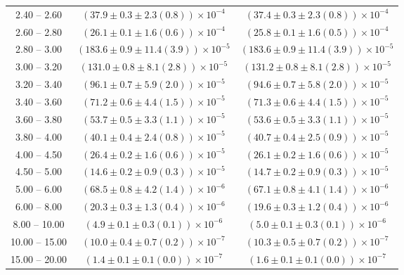 \begin{table}
\begin{center}
\begin{tabular}{ c | c c }
2.40 -- 2.60 & $(37.9\pm0.3\pm2.3(0.8))\times10^{-4}$ & $(37.4\pm0.3\pm2.3(0.8))\times10^{-4}$ \\ 
2.60 -- 2.80 & $(26.1\pm0.1\pm1.6(0.6))\times10^{-4}$ & $(25.8\pm0.1\pm1.6(0.5))\times10^{-4}$ \\ 
2.80 -- 3.00 & $(183.6\pm0.9\pm11.4(3.9))\times10^{-5}$ & $(183.6\pm0.9\pm11.4(3.9))\times10^{-5}$ \\ 
3.00 -- 3.20 & $(131.0\pm0.8\pm8.1(2.8))\times10^{-5}$ & $(131.2\pm0.8\pm8.1(2.8))\times10^{-5}$ \\ 
3.20 -- 3.40 & $(96.1\pm0.7\pm5.9(2.0))\times10^{-5}$ & $(94.6\pm0.7\pm5.8(2.0))\times10^{-5}$ \\ 
3.40 -- 3.60 & $(71.2\pm0.6\pm4.4(1.5))\times10^{-5}$ & $(71.3\pm0.6\pm4.4(1.5))\times10^{-5}$ \\ 
3.60 -- 3.80 & $(53.7\pm0.5\pm3.3(1.1))\times10^{-5}$ & $(53.6\pm0.5\pm3.3(1.1))\times10^{-5}$ \\ 
3.80 -- 4.00 & $(40.1\pm0.4\pm2.4(0.8))\times10^{-5}$ & $(40.7\pm0.4\pm2.5(0.9))\times10^{-5}$ \\ 
4.00 -- 4.50 & $(26.4\pm0.2\pm1.6(0.6))\times10^{-5}$ & $(26.1\pm0.2\pm1.6(0.6))\times10^{-5}$ \\ 
4.50 -- 5.00 & $(14.6\pm0.2\pm0.9(0.3))\times10^{-5}$ & $(14.7\pm0.2\pm0.9(0.3))\times10^{-5}$ \\ 
5.00 -- 6.00 & $(68.5\pm0.8\pm4.2(1.4))\times10^{-6}$ & $(67.1\pm0.8\pm4.1(1.4))\times10^{-6}$ \\ 
6.00 -- 8.00 & $(20.3\pm0.3\pm1.3(0.4))\times10^{-6}$ & $(19.6\pm0.3\pm1.2(0.4))\times10^{-6}$ \\ 
8.00 -- 10.00 & $(4.9\pm0.1\pm0.3(0.1))\times10^{-6}$ & $(5.0\pm0.1\pm0.3(0.1))\times10^{-6}$ \\ 
10.00 -- 15.00 & $(10.0\pm0.4\pm0.7(0.2))\times10^{-7}$ & $(10.3\pm0.5\pm0.7(0.2))\times10^{-7}$ \\ 
15.00 -- 20.00 & $(1.4\pm0.1\pm0.1(0.0))\times10^{-7}$ & $(1.6\pm0.1\pm0.1(0.0))\times10^{-7}$ \\ 
\hline
\end{tabular}
\end{center}
\end{table}
 
